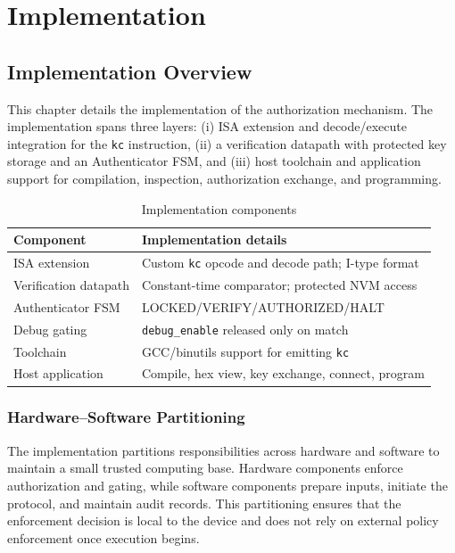 \chapter{Implementation}
\label{chapter4}

\section{Implementation Overview}
This chapter details the implementation of the authorization mechanism. The implementation spans
three layers:
(i) ISA extension and decode/execute integration for the \texttt{kc} instruction, (ii) a
verification datapath with protected key storage and an Authenticator FSM, and (iii) host
toolchain and application support for compilation, inspection, authorization exchange, and
programming.

\begin{table}[H]
  \centering
  \caption{Implementation components}
  \label{tab:impl-components}
  \begin{tabular}{@{}p{3.2cm}p{8.8cm}@{}}
    \toprule
    \textbf{Component} & \textbf{Implementation details} \\
    \midrule
    ISA extension & Custom \texttt{kc} opcode and decode path; I-type format \\
    Verification datapath & Constant-time comparator; protected NVM access \\
    Authenticator FSM & \textsf{LOCKED}/\textsf{VERIFY}/\textsf{AUTHORIZED}/\textsf{HALT} \\
    Debug gating & \texttt{debug\_enable} released only on match \\
    Toolchain & GCC/binutils support for emitting \texttt{kc} \\
    Host application & Compile, hex view, key exchange, connect, program \\
    \bottomrule
  \end{tabular}
\end{table}

\subsection{Hardware--Software Partitioning}
The implementation partitions responsibilities across hardware and software to maintain a
small trusted computing base. Hardware components enforce authorization and gating, while
software components prepare inputs, initiate the protocol, and maintain audit records. This
partitioning ensures that the enforcement decision is local to the device and does not rely
on external policy enforcement once execution begins.

